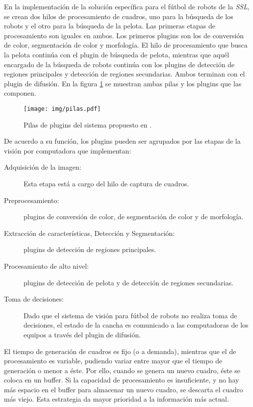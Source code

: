 En la implementación de la solución específica para el fútbol de robots de la
\emph{SSL}, se crean dos hilos de procesamiento de cuadros, uno para la búsqueda
de los robots y el otro para la búsqueda de la pelota. Las primeras etapas de
procesamiento son iguales en ambos. Los primeros plugins son los de conversión
de color, segmentación de color y morfología. El hilo de procesamiento que busca
la pelota continúa con el plugin de búsqueda de pelota, mientras que aquél
encargado de la búsqueda de robots continúa con los plugins de detección de
regiones principales y detección de regiones secundarias. Ambos terminan con el
plugin de difusión. En la figura \ref{pilasPlugins} se muestran ambas pilas y
los plugins que las componen.

\begin{figure}[h]

	\texttt{[image: img/pilas.pdf]}

	\caption{Pilas de plugins del sistema propuesto en \cite{torres2014}.}

	\label{pilasPlugins}

\end{figure}


De acuerdo a su función, los plugins pueden ser agrupados por las etapas de la
visión por computadora que implementan:

\begin{description}

	\item[Adquisición de la imagen:] Esta etapa está a cargo del hilo de
		captura de cuadros.

	\item[Preprocesamiento:] plugins de conversión de color, de segmentación
		de color y de morfología.

	\item[Extracción de características, Detección y Segmentación:] plugins
		de detección de regiones principales.

	\item[Procesamiento de alto nivel:] plugins de detección de pelota y de
		detección de regiones secundarias.

	\item[Toma de decisiones:] Dado que el sistema de visión para fútbol de
		robots no realiza toma de decisiones, el estado de la cancha es
		comunicado a las computadoras de los equipos a través del plugin
		de difusión.

\end{description}

El tiempo de generación de cuadros es fijo (o a demanda), mientras que el de
procesamiento es variable, pudiendo variar entre mayor que el tiempo de
generación o menor a éste. Por ello, cuando se genera un nuevo cuadro, éste se
coloca en un buffer. Si la capacidad de procesamiento es insuficiente, y no
hay más espacio en el buffer para almacenar un nuevo cuadro, se descarta el
cuadro más viejo. Esta estrategia da mayor prioridad a la información más
actual.

